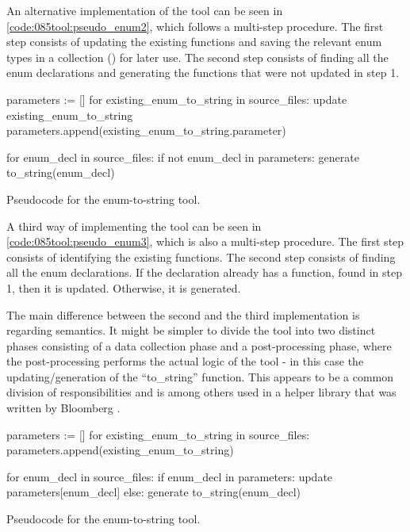 An alternative implementation of the tool can be seen in \cref{code:085tool:pseudo_enum2}, which follows a multi-step procedure. The first step consists of updating the existing  functions and saving the relevant enum types in a collection () for later use. The second step consists of finding all the enum declarations and generating the  functions that were not updated in step 1.

\begin{listing}[H]
    \begin{pythoncode}
parameters := []
for existing_enum_to_string in source_files:
    update existing_enum_to_string
    parameters.append(existing_enum_to_string.parameter)

for enum_decl in source_files:
    if not enum_decl in parameters:
        generate to_string(enum_decl)
    \end{pythoncode}
    \caption{Pseudocode for the enum-to-string tool.}
    \label{code:085tool:pseudo_enum2}
\end{listing}

A third way of implementing the tool can be seen in \cref{code:085tool:pseudo_enum3}, which is also a multi-step procedure. The first step consists of identifying the existing  functions. The second step consists of finding all the enum declarations. If the declaration already has a  function, found in step 1, then it is updated. Otherwise, it is generated.

The main difference between the second and the third implementation is regarding semantics. It might be simpler to divide the tool into two distinct phases consisting of a data collection phase and a post-processing phase, where the post-processing performs the actual logic of the tool - in this case the updating/generation of the ``to\_string'' function. This appears to be a common division of responsibilities and is among others used in a helper library that was written by Bloomberg \cite{ClangmetatoolFrameworkReusing2023}.

\begin{listing}[H]
    \begin{pythoncode}
parameters := []
for existing_enum_to_string in source_files:
    parameters.append(existing_enum_to_string)

for enum_decl in source_files:
    if enum_decl in parameters:
        update parameters[enum_decl]
    else:
        generate to_string(enum_decl)
    \end{pythoncode}
    \caption{Pseudocode for the enum-to-string tool.}
    \label{code:085tool:pseudo_enum3}
\end{listing}

